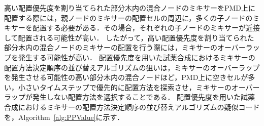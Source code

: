 高い配置優先度を割り当てられた部分木内の混合ノードのミキサーをPMD上に配置する際には，親ノードのミキサーの配置セルの周辺に，多くの子ノードのミキサーを配置する必要がある．その場合，それぞれの子ノードのミキサーが近接して配置される可能性が高い．
したがって，高い配置優先度を割り当てられた部分木内の混合ノードのミキサーの配置を行う際には，ミキサーのオーバーラップを発生する可能性が高い．
配置優先度を用いた試薬合成におけるミキサーの配置方法決定順序の並び替えアルゴリズムの狙いは，ミキサーのオーバーラップを発生させる可能性の高い部分木内の混合ノードほど，PMD上に空きセルが多い，小さいタイムステップで優先的に配置方法を探索させ，ミキサーのオーバーラップが発生しない配置方法を選択することである．
配置優先度を用いた試薬合成におけるミキサーの配置方法決定順序の並び替えアルゴリズムの疑似コードを，Algorithm~\ref{alg:PPValue}に示す．
